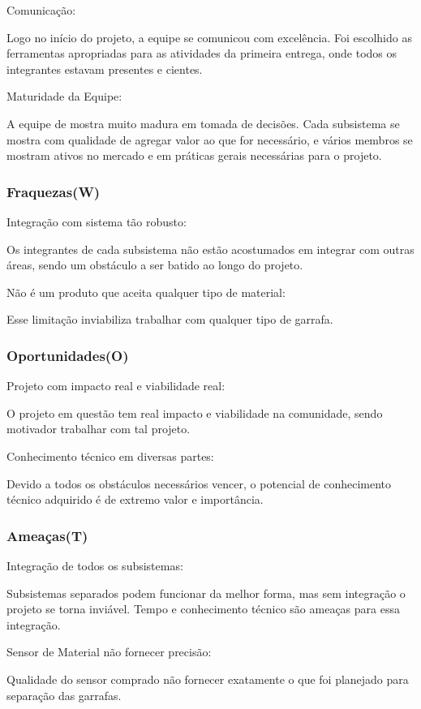 Comunicação:

    Logo no início do projeto, a equipe se comunicou com excelência. Foi escolhido as ferramentas apropriadas para as atividades da primeira entrega, onde todos os integrantes estavam presentes e cientes.

Maturidade da Equipe:

    A equipe de mostra muito madura em tomada de decisões. Cada subsistema se mostra com qualidade de agregar valor ao que for necessário, e vários membros se mostram ativos no mercado e em práticas gerais necessárias para o projeto. 


\subsubsection{Fraquezas(W)}
Integração com sistema tão robusto:

    Os integrantes de cada subsistema não estão acostumados em integrar com outras áreas, sendo um obstáculo a ser batido ao longo do projeto.

Não é um produto que aceita qualquer tipo de material:

    Esse limitação inviabiliza trabalhar com qualquer tipo de garrafa.


\subsubsection{Oportunidades(O)}
Projeto com impacto real e viabilidade real:

    O projeto em questão tem real impacto e viabilidade na comunidade, sendo motivador trabalhar com tal projeto.

Conhecimento técnico em diversas partes:

    Devido a todos os obstáculos necessários vencer, o potencial de conhecimento técnico adquirido é de extremo valor e importância.

\subsubsection{Ameaças(T)}
Integração de todos os subsistemas:
    
    Subsistemas separados podem funcionar da melhor forma, mas sem integração o projeto se torna inviável. Tempo e conhecimento técnico são ameaças para essa integração.

Sensor de Material não fornecer precisão:

    Qualidade do sensor comprado não fornecer exatamente o que foi planejado para separação das garrafas.


